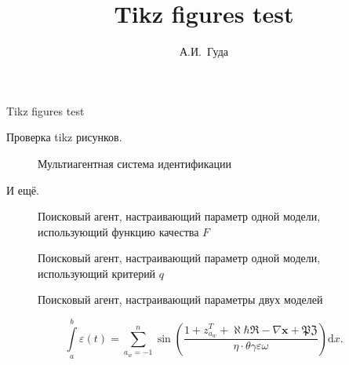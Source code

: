 \documentclass[a4paper,12pt]{article}
\title{Tikz figures test}
\author{А.И.~Гуда}
\begin{document}
\begin{center}
\Large{Tikz figures test}
\end{center}

Проверка tikz рисунков.

\begin{figure}[h!]
\begin{center}

\end{center}
\caption{Мультиагентная система идентификации}
\label{atu:f:f0}
\end{figure}

И ещё.

\begin{figure}[htb!]
\begin{center}

\end{center}
\caption{Поисковый агент, настраивающий параметр одной модели, использующий функцию качества $F$}
\label{atu:f:agent1}
\end{figure}


\begin{figure}[htb!]
\begin{center}

\end{center}
\caption{Поисковый агент, настраивающий параметр одной модели, использующий критерий  $q$}
\label{atu:f:agent1q}
\end{figure}


\begin{figure}[htb!]
\begin{center}

\end{center}
\caption{Поисковый агент, настраивающий параметры двух моделей}
\label{atu:f:agent2}
\end{figure}


\[
  \int\limits_{a}^{b} \varepsilon(t)
  =
  \sum\limits_{a_w=-1}^{n} \sin\left(
    \frac{ 1 + z_{a_w}^T + \aleph \hbar \Re - \nabla \mathbf{x} + \mathfrak{PZ} }
         {\eta \cdot \theta \gamma \varepsilon \omega}
  \right) \mathrm{d} x.
\]
\end{document}
